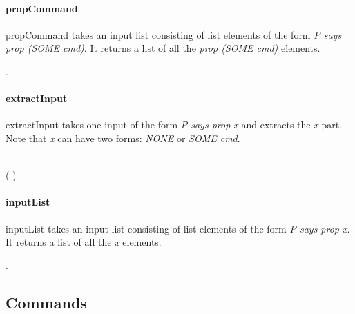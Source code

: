 \documentclass[../../main/main.tex]{subfiles}
\begin{document}
\paragraph*{propCommand}
propCommand takes an input list consisting of list elements of the form \textit{P says prop (SOME cmd)}.  It returns a list of all the \textit{prop (SOME cmd)} elements.
\begin{tabbing}
\parskip=8pt
\HOLTokenTurnstile{} \HOLSymConst{\HOLTokenForall{}}. \\
\hspace{0.3cm}   \HOLSymConst{=}   
\parskip=18pt
\end{tabbing}


\paragraph*{extractInput}
extractInput takes one input of the form \textit{P says prop x} and extracts the \textit{x} part. Note that \textit{x} can have two forms: \textit{NONE} or \textit{SOME cmd}.
\begin{tabbing}
\parskip=8pt
\HOLTokenTurnstile{}\\
\hspace{0.3cm}  (   ) \HOLSymConst{=} 
\parskip=18pt
\end{tabbing}

\paragraph*{inputList}
inputList takes an input list consisting of list elements of the form \textit{P says prop x}.  It returns a list of all the \textit{x} elements.
\begin{tabbing}
\parskip=8pt
\HOLTokenTurnstile{} \HOLSymConst{\HOLTokenForall{}}. \\
\hspace{0.3cm}   \HOLSymConst{=}   
\parskip=18pt
\end{tabbing}


\subsection{Commands}
\end{document}
